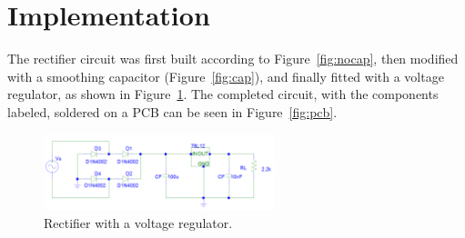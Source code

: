 \documentclass[12pt]{article}
\begin{document}
\section{Implementation}
\label{sec:imp}
The rectifier circuit was first built according to Figure~\ref{fig:nocap}, then modified with a smoothing capacitor (Figure~\ref{fig:cap}), and finally fitted with a voltage regulator, as shown in Figure~\ref{fig:reg}. The completed circuit, with the components labeled, soldered on a PCB can be seen in Figure~\ref{fig:pcb}.
\begin{figure}[h!]
\centering
\includegraphics[width=0.6\textwidth]{rekt_reg}
\caption{Rectifier with a voltage regulator.}
\label{fig:reg}
\end{figure}
\end{document}
